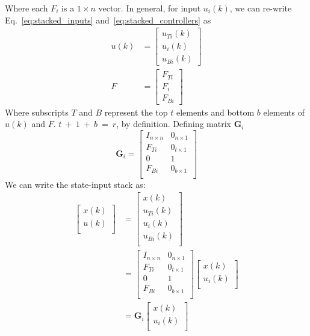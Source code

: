Where each $F_i$ is a $1\times n$ vector. In general, for input $u_i\left(k\right)$, we can re-write Eq.~\ref{eq:stacked_inputs} and~\ref{eq:stacked_controllers} as
\begin{align}
    u(k) &= \left[\begin{matrix}
        u_{Ti}(k) \\
        u_i(k) \\
        u_{Bi}(k)
    \end{matrix}\right] \\
    F &= \left[\begin{matrix}
        F_{Ti} \\
        F_i \\
        F_{Bi}
    \end{matrix}\right]
\end{align}
Where subscripts $T$ and $B$ represent the top $t$ elements and bottom $b$ elements of $u\left(k\right)$ and $F$. $t\ +\ 1\ +\ b\ =\ r$, by definition. Defining matrix $\textbf{G}_i$
\begin{equation}
    \textbf{G}_i=\left[\begin{matrix}I_{n\times n}&0_{n\times1}\\F_{Ti}&0_{t\times1}\\0&1\\F_{Bi}&0_{b\times1}\\\end{matrix}\right]
\end{equation}
We can write the state-input stack as:
\begin{equation}
    \begin{split}
        \left[\begin{matrix}x\left(k\right)\\u\left(k\right)\\\end{matrix}\right]&=\left[\begin{matrix}x\left(k\right)\\u_{Ti}\left(k\right)\\u_i\left(k\right)\\u_{Bi}\left(k\right)\\\end{matrix}\right]\\&=\left[\begin{matrix}I_{n\times n}&0_{n\times1}\\F_{Ti}&0_{t\times1}\\0&1\\F_{Bi}&0_{b\times1}\\\end{matrix}\right]\left[\begin{matrix}x\left(k\right)\\u_i\left(k\right)\\\end{matrix}\right]\\&=\textbf{G}_i\left[\begin{matrix}x(k)\\u_i(k)\\\end{matrix}\right]
    \end{split}
\end{equation}
